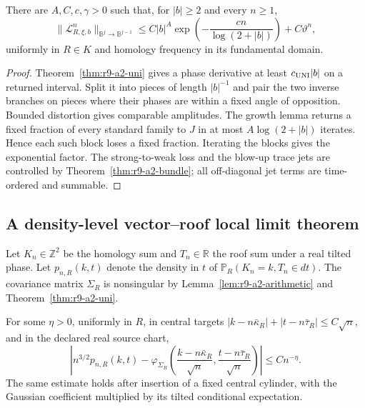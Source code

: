 \begin{theorem}
\label{thm:r9-a2-dolgopyat}
There are $A,C,c,\gamma>0$ such that, for $|b|\ge2$ and every $n\ge1$,
\[
 \|\mathcal L_{R,\xi,b}^n\|_{\mathbb B^j\to\mathbb B^{j-1}}
 \le C|b|^A
 \exp\left(-\frac{cn}{\log(2+|b|)}\right)
 +C\vartheta^n,
\]
uniformly in $R\in K$ and homology frequency in its fundamental domain.
\end{theorem}

\begin{proof}
Theorem~\ref{thm:r9-a2-uni} gives a phase derivative at least
$c_{\rm UNI}|b|$ on a returned interval.  Split it into pieces of length
$|b|^{-1}$ and pair the two inverse branches on pieces where their phases are
within a fixed angle of opposition.  Bounded distortion gives comparable
amplitudes.  The growth lemma returns a fixed fraction of every standard
family to $J$ in at most $A\log(2+|b|)$ iterates.  Hence each such block loses a
fixed fraction.  Iterating the blocks gives the exponential factor.  The
strong-to-weak loss and the blow-up trace jets are controlled by
Theorem~\ref{thm:r9-a2-bundle}; all off-diagonal jet terms are time-ordered and
summable.
\end{proof}

\subsection{A density-level vector--roof local limit theorem}

Let $K_n\in\mathbb Z^2$ be the homology sum and $T_n\in\mathbb R$ the roof
sum under a real tilted phase.  Let $p_{n,R}(k,t)$ denote the density in $t$ of
$\mathbb P_R(K_n=k,T_n\in dt)$.  The covariance matrix $\Sigma_R$ is
nonsingular by Lemma~\ref{lem:r9-a2-arithmetic} and
Theorem~\ref{thm:r9-a2-uni}.

\begin{theorem}
\label{thm:r9-a2-density-llt}
For some $\eta>0$, uniformly in $R$, in central targets
$|k-n\bar\kappa_R|+|t-n\bar\tau_R|\le C\sqrt n$, and in the declared real
source chart,
\[
 \left|
 n^{3/2}p_{n,R}(k,t)
 -\varphi_{\Sigma_R}\left(
 \frac{k-n\bar\kappa_R}{\sqrt n},
 \frac{t-n\bar\tau_R}{\sqrt n}
 \right)
 \right|
 \le Cn^{-\eta}.
\]
The same estimate holds after insertion of a fixed central cylinder, with the
Gaussian coefficient multiplied by its tilted conditional expectation.
\end{theorem}


